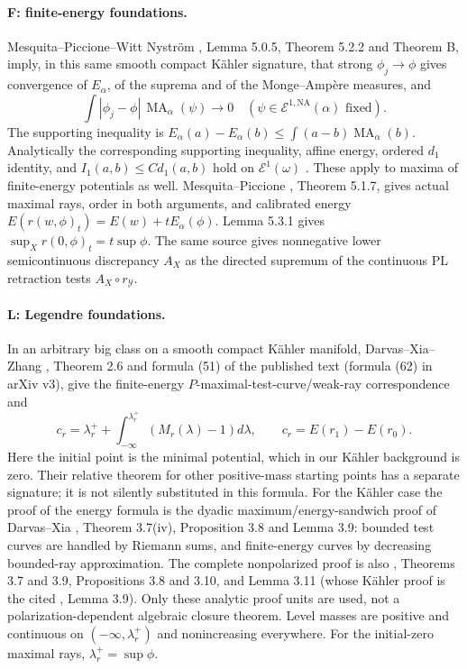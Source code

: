 \documentclass[11pt]{article}
\newcommand{\MA}{\operatorname{MA}}
\newcommand{\NA}{\mathrm{NA}}
\newcommand{\cE}{\mathcal E}
\theoremstyle{remark}\newtheorem{remark}[theorem]{Remark}
\begin{document}
\paragraph{F: finite-energy foundations.}
Mesquita--Piccione--Witt Nystr\"om \cite{MPWN}, Lemma 5.0.5,
Theorem 5.2.2 and Theorem B, imply, in this same smooth compact
K\"ahler signature, that strong $\phi_j\to\phi$ gives convergence of
$E_\alpha$, of the suprema and of the Monge--Amp\`ere measures, and
\[
 \int|\phi_j-\phi|\,\MA_\alpha(\psi)\to0
 \quad(\psi\in\cE^{1,\NA}(\alpha)\text{ fixed}).
\]
The supporting inequality is
$E_\alpha(a)-E_\alpha(b)\leq\int(a-b)\MA_\alpha(b)$.
Analytically the corresponding supporting inequality, affine energy,
ordered $d_1$ identity, and $I_1(a,b)\leq C d_1(a,b)$ hold on
$\cE^1(\omega)$ \cite{D}. These apply to maxima of finite-energy
potentials as well. Mesquita--Piccione \cite{MP}, Theorem 5.1.7,
gives actual maximal rays, order in both arguments, and calibrated
energy $E(r(w,\phi)_t)=E(w)+tE_\alpha(\phi)$.
Lemma 5.3.1 gives $\sup_Xr(0,\phi)_t=t\sup\phi$.
The same source gives nonnegative lower semicontinuous discrepancy
$A_X$ as the directed supremum of the continuous PL retraction tests
$A_X\circ r_{\mathcal Y}$.

\paragraph{L: Legendre foundations.}
In an arbitrary big class on a smooth compact K\"ahler manifold,
Darvas--Xia--Zhang \cite{DXZ}, Theorem 2.6 and formula (51) of the
published text (formula (62) in arXiv v3), give the finite-energy
$P$-maximal-test-curve/weak-ray correspondence and
\begin{equation}\label{eq:legendre-energy}
 c_r=\lambda_r^++\int_{-\infty}^{\lambda_r^+}(M_r(\lambda)-1)d\lambda,
 \qquad c_r=E(r_1)-E(r_0).
\end{equation}
Here the initial point is the minimal potential, which in our
K\"ahler background is zero. Their relative theorem for other
positive-mass starting points has a separate signature; it is not
silently substituted in this formula. For the K\"ahler case the proof
of the energy formula is the dyadic maximum/energy-sandwich proof of
Darvas--Xia \cite{DX}, Theorem 3.7(iv), Proposition 3.8 and Lemma 3.9:
bounded test curves are handled by Riemann sums, and finite-energy
curves by decreasing bounded-ray approximation. The complete
nonpolarized proof is also \cite{DZ}, Theorems 3.7 and 3.9,
Propositions 3.8 and 3.10, and Lemma 3.11 (whose K\"ahler proof
is the cited \cite{DX}, Lemma 3.9). Only these analytic
proof units are used, not a polarization-dependent algebraic closure
theorem. Level masses are positive and continuous on
$(-\infty,\lambda_r^+)$ and nonincreasing everywhere.
For the initial-zero maximal rays, $\lambda_r^+=\sup\phi$.
\end{document}
